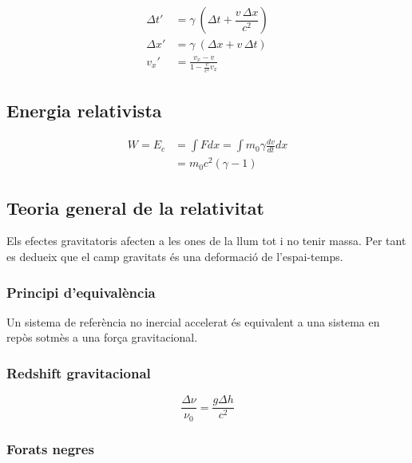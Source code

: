 \begin{align}
    \Delta t' &= \gamma \ \left(\Delta t + \dfrac{v \,\Delta x}{c^{2}} \right) \\
    \Delta x' &= \gamma \ (\Delta x + v \,\Delta t) \\
    v_x' &= \frac{v_x-v}{1-\frac{v}{c^2}v_x}
\end{align}

\subsection{Energia relativista}
\label{sub:energia_relativista}

\begin{align}
    W = E_c &= \int F dx = \int m_0 \gamma \frac{dv}{dt}dx \\
    &= m_0c^2(\gamma -1)
\end{align}

\pagebreak

\subsection{Teoria general de la relativitat}
\label{sub:teoria_general_de_la_relativitat}

Els efectes gravitatoris afecten a les ones de la llum tot i no tenir massa.
Per tant es dedueix que el camp gravitats és una deformació de l'espai-temps.

\subsubsection{Principi d'equivalència}
\label{ssub:principi_d_equivalencia}

Un sistema de referència no inercial accelerat és equivalent a una sistema en
repòs sotmès a una força gravitacional.

\subsubsection{Redshift gravitacional}
\label{ssub:redshift_gravitacional}

\begin{equation}
    \frac{\Delta \nu}{\nu_0} = \frac{g\Delta h}{c^2}
\end{equation}

\subsubsection{Forats negres}
\label{ssub:forats_negres}

